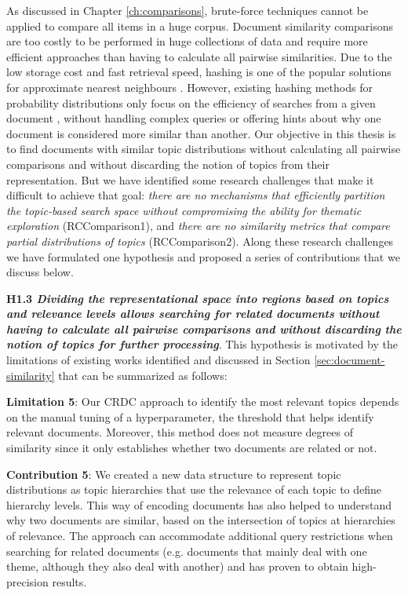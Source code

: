 As discussed in Chapter \ref{ch:comparisons}, brute-force techniques cannot be applied to compare all items in a huge corpus. Document similarity comparisons are too costly to be performed in huge collections of data and require more efficient approaches than having to calculate all pairwise similarities. Due to the low storage cost and fast retrieval speed, hashing is one of the popular solutions for approximate nearest neighbours \citep{Zhen2016}. However, existing hashing methods for probability distributions only focus on the efficiency of searches from a given document \citep{Mao2017}, without handling complex queries or offering hints about why one document is considered more similar than another. Our objective in this thesis is to find documents with similar topic distributions without calculating all pairwise comparisons and without discarding the notion of topics from their representation. But we have identified some research challenges that make it difficult to achieve that goal: \textit{there are no mechanisms that efficiently partition the topic-based search space without compromising the ability for thematic exploration} (RCComparison1), and \textit{there are no similarity metrics that compare partial distributions of topics} (RCComparison2). Along these research challenges we have formulated one hypothesis and proposed a series of contributions that we discuss below.

\textbf{H1.3 \textit{Dividing the representational space into regions based on topics and relevance levels allows searching for related documents without having to calculate all pairwise comparisons and without discarding the notion of topics for further processing}}. This hypothesis is motivated by the limitations of existing works identified and discussed in Section \ref{sec:document-similarity} that can be summarized as follows:


\textbf{Limitation 5}: Our CRDC approach to identify the most relevant topics depends on the manual tuning of a hyperparameter, the threshold that helps identify relevant documents. Moreover, this method does not measure degrees of similarity since it only establishes whether two documents are related or not. 

\textbf{Contribution 5}: We created a new data structure to represent topic distributions as topic hierarchies that use the relevance of each topic to define hierarchy levels. This way of encoding documents has also helped to understand why two documents are similar, based on the intersection of topics at hierarchies of relevance. The approach can accommodate additional query restrictions when searching for related documents (e.g. documents that mainly deal with one theme, although they also deal with another) and has proven to obtain high-precision results. 

